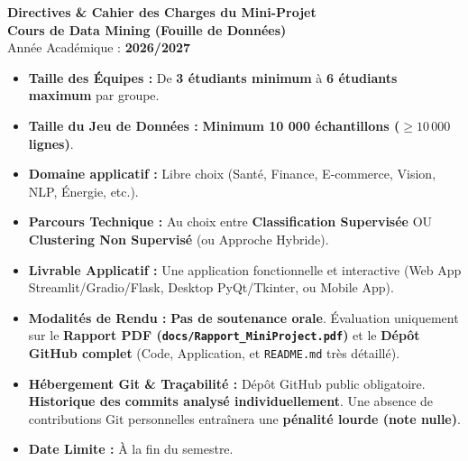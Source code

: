 \documentclass[11pt,a4paper]{article}
\begin{document}
\begin{tcolorbox}[colback=sintefblue, colframe=sintefblue, arc=3mm, halign=center, colupper=white]
    \vspace{0.2cm}
    {\Huge \bfseries Directives \& Cahier des Charges du Mini-Projet}\\[0.3cm]
    {\Large \bfseries Cours de Data Mining (Fouille de Données)}\\[0.2cm]
    {\large Année Académique : \textbf{2026/2027}}
    \vspace{0.2cm}
\end{tcolorbox}

\vspace{0.3cm}

\begin{tcolorbox}[colback=sintefgold!15, colframe=sintefgold!80!black, title=\textbf{EN BREF — RÈGLES ET MODALITÉS DU PROJET}, arc=2mm]
    \begin{itemize}[leftmargin=*]
        \item \textbf{Taille des Équipes :} De \textbf{3 étudiants minimum} à \textbf{6 étudiants maximum} par groupe.
        \item \textbf{Taille du Jeu de Données :} \textbf{Minimum 10 000 échantillons ($\ge 10\,000$ lignes)}.
        \item \textbf{Domaine applicatif :} Libre choix (Santé, Finance, E-commerce, Vision, NLP, Énergie, etc.).
        \item \textbf{Parcours Technique :} Au choix entre \textbf{Classification Supervisée} OU \textbf{Clustering Non Supervisé} (ou Approche Hybride).
        \item \textbf{Livrable Applicatif :} Une application fonctionnelle et interactive (Web App Streamlit/Gradio/Flask, Desktop PyQt/Tkinter, ou Mobile App).
        \item \textbf{Modalités de Rendu :} \textbf{Pas de soutenance orale}. Évaluation uniquement sur le \textbf{Rapport PDF (\texttt{docs/Rapport\_MiniProject.pdf})} et le \textbf{Dépôt GitHub complet} (Code, Application, et \texttt{README.md} très détaillé).
        \item \textbf{Hébergement Git \& Traçabilité :} Dépôt GitHub public obligatoire. \textbf{Historique des commits analysé individuellement}. Une absence de contributions Git personnelles entraînera une \textbf{pénalité lourde (note nulle)}.
        \item \textbf{Date Limite :} À la fin du semestre.
    \end{itemize}
\end{tcolorbox}
\end{document}
